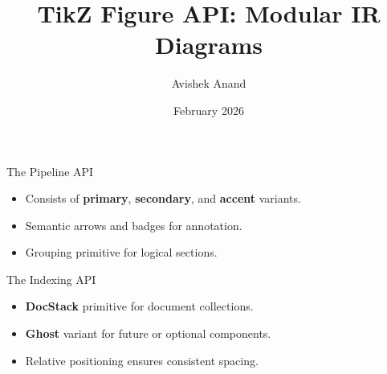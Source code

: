 \documentclass[aspectratio=169]{beamer}
\title{TikZ Figure API: Modular IR Diagrams}
\author{Avishek Anand}
\date{February 2026}
\begin{document}
\begin{frame}
    \titlepage
\end{frame}

\begin{frame}{The Pipeline API}
    \begin{center}
    
    \end{center}
    
    \vspace{1em}
    \begin{itemize}
        \item Consists of \textbf{primary}, \textbf{secondary}, and \textbf{accent} variants.
        \item Semantic arrows and badges for annotation.
        \item Grouping primitive for logical sections.
    \end{itemize}
\end{frame}

\begin{frame}{The Indexing API}
    \begin{center}
    
    \end{center}
    
    \vspace{1em}
    \begin{itemize}
        \item \textbf{DocStack} primitive for document collections.
        \item \textbf{Ghost} variant for future or optional components.
        \item Relative positioning ensures consistent spacing.
    \end{itemize}
\end{frame}
\end{document}

